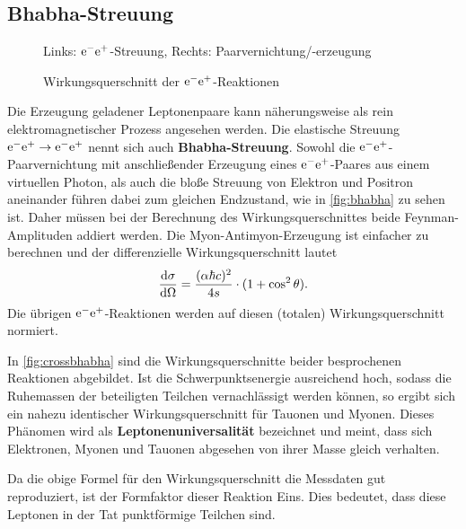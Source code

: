 \subsection{Bhabha-Streuung}
\begin{figure}
	\caption{Links: $\el\pos$-Streuung, Rechts: Paarvernichtung/-erzeugung}
	\label{fig:bhabha}
\end{figure}
\begin{figure}
	\caption{Wirkungsquerschnitt der $\el\pos$-Reaktionen}
	\label{fig:crossbhabha}
\end{figure}
Die Erzeugung geladener Leptonenpaare kann näherungsweise als rein elektromagnetischer Prozess angesehen werden.
Die elastische Streuung $\el\pos\rightarrow\el\pos$ nennt sich auch \textbf{Bhabha-Streuung}.
Sowohl die $\el\pos$-Paarvernichtung mit anschließender Erzeugung eines $\el\pos$-Paares aus einem virtuellen Photon, als auch die bloße Streuung von Elektron und Positron aneinander führen dabei zum gleichen Endzustand, wie in \autoref{fig:bhabha} zu sehen ist.
Daher müssen bei der Berechnung des Wirkungsquerschnittes beide Feynman-Amplituden addiert werden.
Die Myon-Antimyon-Erzeugung ist einfacher zu berechnen und der differenzielle Wirkungsquerschnitt lautet
\begin{equation*}
	\diff[\sigma]{\Omega} = \frac{(\alpha\hbar c)^2}{4s}\cdot(1+\cos^2\theta).
\end{equation*}
Die übrigen $\el\pos$-Reaktionen werden auf diesen (totalen) Wirkungsquerschnitt normiert.

In \autoref{fig:crossbhabha} sind die Wirkungsquerschnitte beider besprochenen Reaktionen abgebildet.
Ist die Schwerpunktsenergie ausreichend hoch, sodass die Ruhemassen der beteiligten Teilchen vernachlässigt werden können, so ergibt sich ein nahezu identischer Wirkungsquerschnitt für Tauonen und Myonen.
Dieses Phänomen wird als \textbf{Leptonenuniversalität} bezeichnet und meint, dass sich Elektronen, Myonen und Tauonen abgesehen von ihrer Masse gleich verhalten.

Da die obige Formel für den Wirkungsquerschnitt die Messdaten gut reproduziert, ist der Formfaktor dieser Reaktion Eins.
Dies bedeutet, dass diese Leptonen in der Tat punktförmige Teilchen sind.
